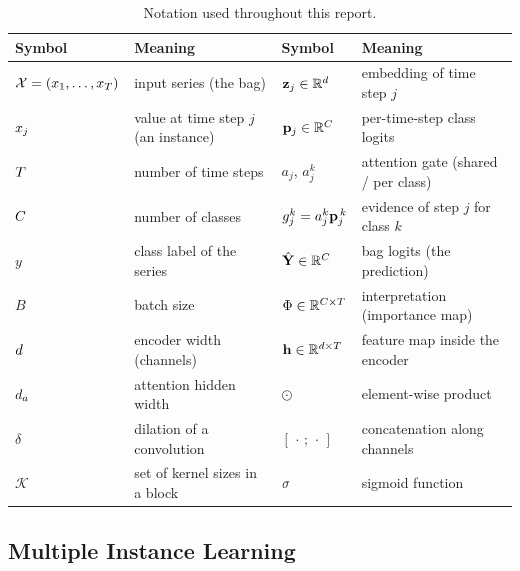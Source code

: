 \begin{table}[h]
\caption{Notation used throughout this report.}
\label{tab:notation}
\begin{center}
\small
\setlength{\tabcolsep}{5pt}
\begin{tabular}{@{}ll@{\qquad}ll@{}}
\toprule
\textbf{Symbol} & \textbf{Meaning} & \textbf{Symbol} & \textbf{Meaning} \\
\midrule
$\mathcal{X} = (x_1,\dots,x_{T})$ & input series (the bag) & $\mathbf{z}_j \in \mathbb{R}^{d}$ & embedding of time step $j$ \\
$x_j$          & value at time step $j$ (an instance) & $\mathbf{p}_j \in \mathbb{R}^{C}$ & per-time-step class logits \\
$T$          & number of time steps                & $a_j$, $a_j^k$ & attention gate (shared / per class) \\
$C$            & number of classes                   & $g_j^k = a_j^k \mathbf{p}_j^{\,k}$ & evidence of step $j$ for class $k$ \\
$y$                & class label of the series           & $\hat{\mathbf{Y}} \in \mathbb{R}^{C}$ & bag logits (the prediction) \\
$B$                & batch size                          & $\Phi \in \mathbb{R}^{C \times T}$ & interpretation (importance map) \\
$d$          & encoder width (channels)            & $\mathbf{h} \in \mathbb{R}^{d \times T}$ & feature map inside the encoder \\
$d_a$           & attention hidden width              & $\odot$ & element-wise product \\
$\delta$           & dilation of a convolution           & $[\,\cdot\,;\,\cdot\,]$ & concatenation along channels \\
$\mathcal{K}$      & set of kernel sizes in a block      & $\sigma$ & sigmoid function \\
\bottomrule
\end{tabular}
\end{center}
\end{table}

\subsection{Multiple Instance Learning}
\label{sec:bg:mil}

